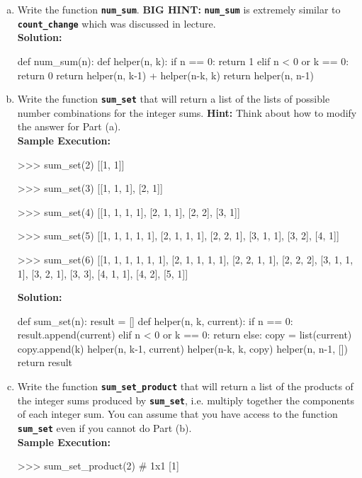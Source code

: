 \begin{enumerate}[(a)]
\item Write the function \texttt{\bfseries num\_sum}. \textbf{BIG HINT:} \texttt{\bfseries num\_sum} is extremely 
similar to \texttt{\bfseries count\_change} which was discussed in lecture. \\
\textbf{Solution:}
\begin{python}
def num_sum(n):
    def helper(n, k):
        if n == 0:
            return 1
        elif n < 0 or k == 0:
            return 0
        return helper(n, k-1) + helper(n-k, k)
    return helper(n, n-1)
\end{python}

\item Write the function \texttt{\bfseries sum\_set} that will return a list of the lists of possible number 
combinations for the integer sums. \textbf{Hint:} Think about how to modify the answer for Part (a). \\
\textbf{Sample Execution:}
\begin{python}
>>> sum_set(2)
[[1, 1]]

>>> sum_set(3)
[[1, 1, 1], [2, 1]]

>>> sum_set(4)
[[1, 1, 1, 1], [2, 1, 1], [2, 2], [3, 1]]

>>> sum_set(5)
[[1, 1, 1, 1, 1], [2, 1, 1, 1], [2, 2, 1], [3, 1, 1], [3, 2],
[4, 1]]

>>> sum_set(6)
[[1, 1, 1, 1, 1, 1], [2, 1, 1, 1, 1], [2, 2, 1, 1], [2, 2, 2],
[3, 1, 1, 1], [3, 2, 1], [3, 3], [4, 1, 1], [4, 2], [5, 1]]
\end{python}
\textbf{Solution:}
\begin{python}
def sum_set(n):
    result = []
    def helper(n, k, current):
        if n == 0:
            result.append(current)
        elif n < 0 or k == 0:
            return
        else:
            copy = list(current)
            copy.append(k)
            helper(n, k-1, current)
            helper(n-k, k, copy)
    helper(n, n-1, [])
    return result
\end{python}

\item Write the function \texttt{\bfseries sum\_set\_product} that will return a list of the products of the integer
sums produced by \texttt{\bfseries sum\_set}, i.e. multiply together the components of each integer sum. You can
assume that you have access to the function \texttt{\bfseries sum\_set} even if you cannot do Part (b). \\
\textbf{Sample Execution:}
\begin{python}
>>> sum_set_product(2) # 1x1
[1]


\end{python}
\end{enumerate}
